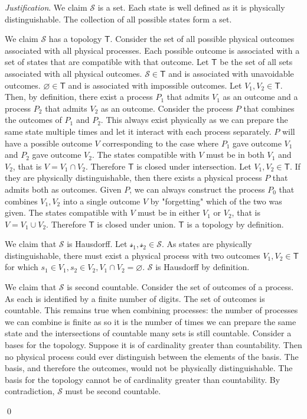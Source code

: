 \documentclass[aps,pra,10pt,twocolumn,floatfix,nofootinbib]{revtex4-1}
\theoremstyle{definition}
\newenvironment{justification}{\emph{Justification}.}{\qed}
\begin{document}
\begin{justification}
We claim $\mathcal{S}$ is a set. Each state is well defined as it is physically distinguishable. The collection of all possible states form a set.

We claim $\mathcal{S}$ has a topology $\mathsf{T}$. Consider the set of all possible physical outcomes associated with all physical processes. Each possible outcome is associated with a set of states that are compatible with that outcome. Let $\mathsf{T}$ be the set of all sets associated with all physical outcomes. $\mathcal{S} \in \mathsf{T}$ and is associated with unavoidable outcomes. $\varnothing \in \mathsf{T}$ and is associated with impossible outcomes. Let $V_1, V_2 \in \mathsf{T}$. Then, by definition, there exist a process $P_1$ that admits $V_1$ as an outcome and a process $P_2$ that admits $V_2$ as an outcome. Consider the process $P$ that combines the outcomes of $P_1$ and $P_2$. This always exist physically as we can prepare the same state multiple times and let it interact with each process separately. $P$ will have a possible outcome $V$ corresponding to the case where $P_1$ gave outcome $V_1$ and $P_2$ gave outcome $V_2$. The states compatible with $V$ must be in both $V_1$ and $V_2$, that is $V = V_1 \cap V_2$. Therefore $\mathsf{T}$ is closed under intersection. Let $V_1, V_2 \in \mathsf{T}$. If they are physically distinguishable, then there exists a physical process $P$ that admits both as outcomes. Given $P$, we can always construct the process $P_0$ that combines $V_1, V_2$ into a single outcome $V$ by "forgetting" which of the two was given. The states compatible with $V$ must be in either $V_1$ or $V_2$, that is $V = V_1 \cup V_2$. Therefore $\mathsf{T}$ is closed under union. $\mathsf{T}$ is a topology by definition.

We claim that $\mathcal{S}$ is Hausdorff. Let $\mathcal{s_1}, \mathcal{s_2} \in \mathcal{S}$. As states are physically distinguishable, there must exist a physical process with two outcomes $V_1, V_2 \in \mathsf{T}$ for which $s_1 \in V_1, s_2 \in V_2, V_1 \cap V_2 = \varnothing$. $\mathcal{S}$ is Hausdorff by definition.

We claim that $\mathcal{S}$ is second countable. Consider the set of outcomes of a process. As each is identified by a finite number of digits. The set of outcomes is countable. This remains true when combining processes: the number of processes we can combine is finite as so it is the number of times we can prepare the same state and the intersections of countable many sets is still countable. Consider a bases for the topology. Suppose it is of cardinality greater than countability. Then no physical process could ever distinguish between the elements of the basis. The basis, and therefore the outcomes, would not be physically distinguishable. The basis for the topology cannot be of cardinality greater than countability. By contradiction, $\mathcal{S}$ must be second countable.

\end{justification}
\end{document}
